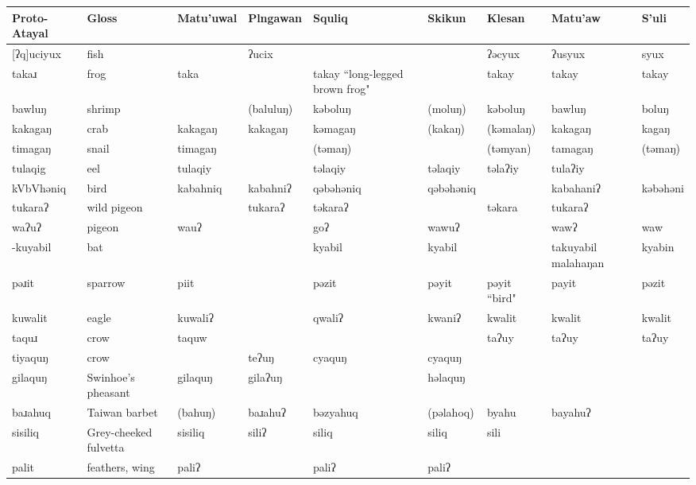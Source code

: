
\begin{landscape}

\begin{longtable}{*{9}{>{\raggedright\arraybackslash}p{}}}
Proto-Atayal & Gloss & Matu'uwal & Plngawan & Squliq & Skikun & Klesan & Matu'aw & S'uli\\\toprule\endhead
\text{*}[ʔq]uciyux & fish &  & ʔucix &  &  & ʔəcyux & ʔusyux & syux\\
\text{*}takaɹ & frog & taka &  & takay ``long-legged brown frog" &  & takay & takay & takay\\
\text{*}bawluŋ & shrimp &  & (baluluŋ) & kəboluŋ & (moluŋ) & kəboluŋ & bawluŋ & boluŋ\\
\text{*}kakagaŋ & crab & kakagaŋ & kakagaŋ & kəmagaŋ & (kakaŋ) & (kəmalaŋ) & kakagaŋ & kagaŋ\\
\text{*}timagaŋ & snail & timagaŋ &  & (təmaŋ) &  & (təmyan) & tamagaŋ & (təmaŋ)\\
\text{*}tulaqig & eel & tulaqiy &  & təlaqiy & təlaqiy & təlaʔiy & tulaʔiy & \\
\text{*}kVbVhəniq & bird & kabahniq & kabahniʔ & qəbəhəniq & qəbəhəniq &  & kabahaniʔ & kəbəhəni\\
\text{*}tukaraʔ & wild pigeon &  & tukaraʔ & təkaraʔ &  & təkara & tukaraʔ & \\
\text{*}waʔuʔ & pigeon & wauʔ &  & goʔ & wawuʔ &  & wawʔ & waw\\
\text{*}-kuyabil & bat &  &  & kyabil & kyabil &  & takuyabil malahaŋan & kyabin\\
\text{*}pəɹit & sparrow & piit &  & pəzit & pəyit & pəyit ``bird" & payit & pəzit\\
\text{*}kuwalit & eagle & kuwaliʔ &  & qwaliʔ & kwaniʔ & kwalit & kwalit & kwalit\\
\text{*}taquɹ & crow & taquw &  &  &  & taʔuy & taʔuy & taʔuy\\
\text{*}tiyaquŋ & crow &  & teʔuŋ & cyaquŋ & cyaquŋ &  &  & \\
\text{*}gilaquŋ & Swinhoe's pheasant & gilaquŋ & gilaʔuŋ &  & həlaquŋ &  &  & \\
\text{*}baɹahuq & Taiwan barbet & (bahuŋ) & baɹahuʔ & bəzyahuq & (pəlahoq) & byahu & bayahuʔ & \\
\text{*}sisiliq & Grey-cheeked fulvetta & sisiliq & siliʔ & siliq & siliq & sili &  & \\
\text{*}palit & feathers, wing & paliʔ &  & paliʔ & paliʔ &  &  & \\

\end{longtable}
\end{landscape}
